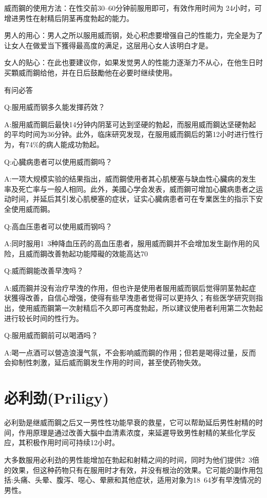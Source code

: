 \documentclass[12pt,UTF8]{ctexbook}
\begin{document}
威而鋼的使用方法：在性交前30--60分钟前服用即可，有效作用时间为
24小时，可增进男性在射精后阴茎再度勃起的能力。

男人的用心：男人之所以服用威而钢，处心积虑要增强自己的性能力，完全是为了让女人在做爱当下獲得最高度的满足，这层用心女人该明白才是。

女人的贴心：在此也要建议你，如果发觉男人的性能力逐渐力不从心，在他生日时买顆威而鋼给他，并在日后鼓勵他在必要时继续使用。

有问必答

Q:服用威而钢多久能发揮药效？

A:服用威而鋼后最快14分钟内阴茎可达到坚硬的勃起，而服用威而鋼达坚硬勃起的平均时间为36分钟。此外，临床研究发现，在服用威而鋼后的第12小时进行性行为，有74\%的病人能成功勃起。

Q:心臓病患者可以使用威而鋼吗？

A:一项大规模实验的结果指出，威而鋼使用者其心肌梗塞与缺血性心臟病的发生率及死亡率与一般人相同。此外，美國心学会发表，威而鋼可增加心臓病患者之运动时间，并延后其引发心肌梗塞的症状，证实心臓病患者可在专業医生的指示下安全使用威而鋼。

Q:高血压患者可以使用威而钢吗？

A:同时服用1~3种降血压药的高血压患者，服用威而鋼并不会增加发生副作用的风险，且威而鋼改善勃起功能障礙的效能高达70%

Q:威而鋼能改善早洩吗？

A:威而鋼并没有治疗早洩的作用，但也许是使用者服用威而钢后觉得阴茎勃起症状獲得改善，自信心增强，使得有些早洩患者觉得可以更持久；有些医学研究则指出，使用威而鋼第一次射精后不久即可再度勃起，所以建议使用者利用第二次勃起进行较长时间的性行为。

Q:服用威而鋼前可以喝酒吗？

A:喝一点酒可以營造浪漫气氛，不会影响威而鋼的作用；但若是喝得过量，反而会抑制性刺激，延后威而鋼发生作用的时间，甚至使药物失效。

\section{必利劲(Priligy)}

必利勁是继威而鋼之后又一男性性功能早衰的救星，它可以帮助延后男性射精的时间，作用原理是通过改善大腦中血清素浓度，来延遲导致男性射精的某些化学反应，其积极作用时间可持续12小时。

大多数服用必利劲的男性能增加在勃起和射精之间的时间，同时为他们提供2~3倍的效果，但这种药物只有在服用时才有效，并没有根治的效果。它可能的副作用包括:头痛、头晕、腹泻、噁心、晕厥和其他症状，适用对象为18~64岁有早洩情况的男性。
\end{document}
